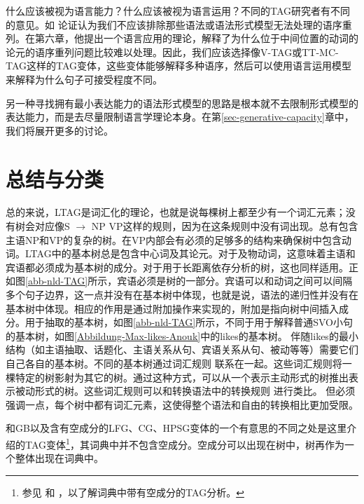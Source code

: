 什么应该被视为语言能力？什么应该被视为语言运用？不同的TAG研究者有不同的意见。如 \citet[]{Rambow94a}论证认为我们不应该排除那些语法或语法形式模型无法处理的语序重列。在第六章，他提出一个语言应用的理论，解释了为什么位于中间位置的动词的论元的语序重列问题比较难以处理。因此，我们应该选择像V-TAG或TT-MC-TAG这样的TAG变体\citep{Lichte2007a}，这些变体能够解释多种语序，然后可以使用语言运用模型来解释为什么句子可接受程度不同。

另一种寻找拥有最小表达能力的语法形式模型的思路是根本就不去限制形式模型的表达能力，而是去尽量限制语言学理论本身。在第\ref{sec-generative-capacity}章中，我们将展开更多的讨论。 

\section{总结与分类}

总的来说，LTAG是词汇化的理论，也就是说每棵树上都至少有一个词汇元素；没有树会对应像S $\to$ NP VP这样的规则，因为在这条规则中没有词出现。总有包含主语NP和VP的复杂的树。在VP内部会有必须的足够多的结构来确保树中包含动词。LTAG中的基本树总是包含中心词及其论元。对于及物动词，这意味着主语和宾语都必须成为基本树的成分。对于用于长距离依存分析的树，这也同样适用。正如图\ref{abb-nld-TAG}所示，宾语必须是树的一部分。宾语可以和动词之间可以间隔多个句子边界，这一点并没有在基本树中体现，也就是说，语法的递归性并没有在基本树中体现。相应的作用是通过附加操作来实现的，附加是指向树中间插入成分。用于抽取的基本树，如图\ref{abb-nld-TAG}所示，不同于用于解释普通SVO小句的基本树，如图\ref{Abbildung-Max-likes-Anouk}中的likes的基本树。 伴随likes的最小结构（如主语抽取、话题化、主语关系从句、宾语关系从句、被动等等）需要它们自己各自的基本树\citep[]{KJ2003a}。不同的基本树通过词汇规则
联系在一起。这些词汇规则将一棵特定的树影射为其它的树。通过这种方式，可以从一个表示主动形式的树推出表示被动形式的树。这些词汇规则可以和转换语法中的转换规则
进行类比。 但必须强调一点，每个树中都有词汇元素，这使得整个语法和自由的转换相比更加受限。

和GB以及含有空成分的LFG、CG、HPSG变体的一个有意思的不同之处是这里介绍的TAG变体\footnote{%
  参见 和 ，以了解词典中带有空成分的TAG分析。
}，其词典中并不包含空成分。空成分可以出现在树中，树再作为一个整体出现在词典中。

